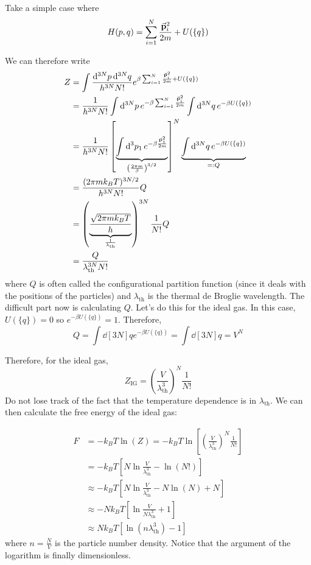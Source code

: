 \documentclass[a4paper,twoside,master.tex]{subfiles}
\begin{document}

Take a simple case where
\begin{equation}
    H(p, q) = \sum_{i=1}^{N} \frac{\va{p}_i^2}{2m} + U(\{q\})
\end{equation}

We can therefore write
\begin{align}
    Z &= \int \frac{\dd[3N]{p} \dd[3N]{q}}{h^{3N} N!} e^{\beta \sum_{i=1}^{N} \frac{\va{p}_i^2}{2m} + U(\{q\})} \\
    &= \frac{1}{h^{3N} N!} \int \dd[3N]{p} e^{- \beta \sum_{i=1}^{N} \frac{\va{p}^2_i}{2m}} \int \dd[3N]{q} e^{- \beta U(\{q\})} \\
    &= \frac{1}{h^{3N} N!} \left[ \underbrace{\int \dd[3]{p_1} e^{- \beta \frac{\va{p}_1^2}{2m}}}_{\left( \frac{2 \pi m}{\beta} \right)^{3/2}} \right]^N \underbrace{\int \dd[3N]{q} e^{- \beta U(\{q\})}}_{=:Q} \\
    &= \frac{(2 \pi m k_B T)^{3N/2}}{h^{3N} N!} Q \\
    &= \left( \underbrace{\frac{\sqrt{2 \pi m k_B T}}{h}}_{\frac{1}{\lambda_{\text{th}}}} \right)^{3N} \frac{1}{N!} Q \\
    &= \frac{Q}{\lambda_{\text{th}}^{3N} N!}
\end{align}
where $ Q $ is often called the configurational partition function (since it deals with the positions of the particles) and $ \lambda_{\text{th}} $ is the thermal de Broglie wavelength. The difficult part now is calculating $ Q $. Let's do this for the ideal gas. In this case, $ U(\{q\}) = 0 $ so $ e^{- \beta U(\{q\})} = 1 $. Therefore,
\begin{equation}
    Q = \int \dd[3N]{q} e^{- \beta U(\{q\})} = \int \dd[3N]{q} = V^N
\end{equation}

Therefore, for the ideal gas,
\begin{equation}
    Z_{\text{IG}} = \left( \frac{V}{\lambda_{\text{th}}^3} \right)^N \frac{1}{N!}
\end{equation}
Do not lose track of the fact that the temperature dependence is in $ \lambda_{\text{th}} $. We can then calculate the free energy of the ideal gas:

\begin{align}
    F &= - k_B T \ln(Z) = - k_B T \ln\left[ \left( \frac{V}{\lambda_{\text{th}}^3} \right)^N \frac{1}{N!} \right] \\
    &= - k_B T \left[ N \ln \frac{V}{\lambda^3_{\text{th}}} - \ln(N!) \right] \\
    & \approx - k_B T \left[ N \ln \frac{V}{\lambda_{\text{th}}^3} - N \ln(N) + N  \right] \\
    & \approx - N k_B T \left[ \ln \frac{V}{N \lambda^3_{\text{th}}} + 1 \right] \\
    & \approx N k_B T \left[ \ln(n \lambda^3_{\text{th}}) - 1 \right]
\end{align}
where $ n = \frac{N}{V} $ is the particle number density. Notice that the argument of the logarithm is finally dimensionless.
\end{document}
